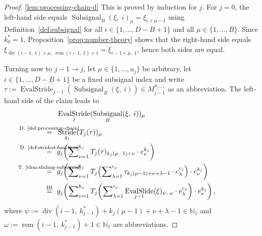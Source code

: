 \documentclass[journal]{IEEEtran}
\newcommand{\N}{\mathbb{N}}
\newcommand{\ROI}{B}
\newcommand{\discint}[2]{\{#1,\dotsc,#2\}}
\newcommand{\inint}[2]{\in\discint{#1}{#2}}
\DeclareMathOperator{\Subsignal}{Subsignal}
\DeclareMathOperator{\Stride}{Stride}
\DeclareMathOperator{\EvalStride}{EvalStride}
\DeclareMathOperator{\EvalSlide}{EvalSlide}
\renewcommand{\div}[2]{\operatorname{div}(#1,\ #2)}
\newcommand{\rem}[2]{\operatorname{rem}(#1,\ #2)}
\newcommand{\equsing}[1]{\overset{\mathclap{\text{#1}}}{=}}
\begin{document}
\begin{proof}
\ref{lem:processing-chain-d}
This is proved by induction for $j$.
For $j = 0$, the left-hand side equals $\Subsignal_\ROI(\xi,\; i)_\mu = \xi_{i + \mu - 1}$ using Definition~\ref{def:subsignal} for all $i\inint{1}{D - \ROI + 1}$ and all $\mu\inint{1}{\ROI}$.
Since $k_0^* = 1$, Proposition~\ref{prop:number-theory} shows that the right-hand side equals $\xi_{\div{i - 1}{1} + \mu,\;\rem{i - 1}{1} + 1} = \xi_{i - 1 + \mu,\; 1}$, hence both sides are equal.

Turning now to $j - 1\to j$,
let $\mu\inint{1}{u_j}$ be arbitrary, let $i\inint{1}{D - \ROI + 1}$ be a fixed subsignal index and write $\tau := \EvalStride_{j - 1}(\Subsignal_\ROI(\xi,\;i))\in M_{j - 1}^{u_{j - 1}}$ as an abbreviation.
The left-hand side of the claim leads to
\begin{align*}
  & \EvalStride_j(\Subsignal_\ROI(\xi,\;i))_\mu\\
  \equsing{D.~\ref{def:processing-chain}}\ \ & \Stride_{g_j}(T_j(\tau))_\mu\\
  \equsing{D.~\ref{def:strided-function}}\ \ & g_j\!\left( \sum\nolimits_{\nu = 1}^{k_j} T_j(\tau)_{k_j(\mu - 1) + \nu}\cdot e_\nu^{k_j} \right)\\
  \equsing{T.~\ref{thm:sliding-subsignal}}\ \ & g_j\!\left( \sum\nolimits_{\nu = 1}^{k_j} T_j\!\left( \sum\nolimits_{\lambda = 1}^{c_j} \tau_{k_j(\mu - 1) + \nu + \lambda - 1}\cdot e_\lambda^{c_j} \right)\cdot e_\nu^{k_j} \right)\\
\equsing{IH}\ \ & g_j\!\left( \sum\nolimits_{\nu = 1}^{k_j} T_j\!\left( \sum\nolimits_{\lambda = 1}^{c_j} \EvalSlide_{j - 1}(\xi)_{\psi,\;\omega}\cdot e_\lambda^{c_j} \right)\cdot e_\nu^{k_j} \right)\text{,}
\end{align*}
where ${\psi := \div{i - 1}{k_{j - 1}^*} + k_j(\mu - 1) + \nu + \lambda - 1\in\N_1}$ and ${\omega := \rem{i - 1}{k_{j - 1}^*} + 1\in\N_1}$ are abbreviations.


\end{proof}
\end{document}
